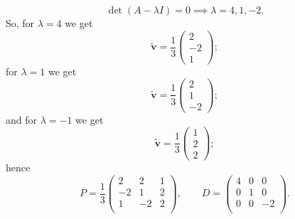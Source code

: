 \begin{solution}
    \[ \det{(A - \lambda I)} = 0 \implies \lambda = 4, 1, -2. \]
    So, for $\lambda = 4$ we get \[ \tilde{\bm v} = \frac13 \begin{pmatrix} 2 \\ -2 \\ 1 \end{pmatrix}; \] for $\lambda = 1$ we get \[ \tilde{\bm v} = \frac13 \begin{pmatrix} 2 \\ 1 \\ -2 \end{pmatrix}; \] and for $\lambda = -1$ we get \[ \tilde{\bm v} = \frac13 \begin{pmatrix} 1 \\ 2 \\ 2 \end{pmatrix}; \] hence 
    \[
        P = \frac13
        \begin{pmatrix}
            2 & 2 & 1 \\
            -2 & 1 & 2 \\
            1 & -2 & 2 \\
        \end{pmatrix}
        , \qquad D =
        \begin{pmatrix}
            4 & 0 & 0 \\
            0 & 1 & 0 \\
            0 & 0 & -2 \\
        \end{pmatrix}
        .
    \]
\end{solution}

